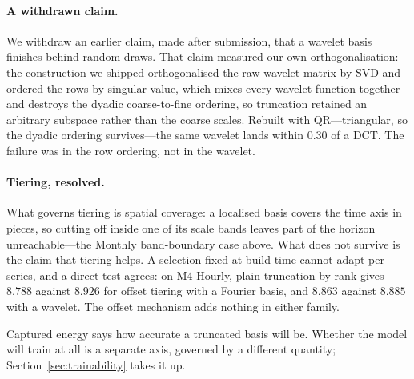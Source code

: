 \paragraph{A withdrawn claim.}
We withdraw an earlier claim, made after submission, that a wavelet basis
finishes behind random draws. That claim measured our own orthogonalisation: the
construction we shipped orthogonalised the raw wavelet matrix by SVD and ordered
the rows by singular value, which mixes every wavelet function together and
destroys the dyadic coarse-to-fine ordering, so truncation retained an arbitrary
subspace rather than the coarse scales. Rebuilt with QR---triangular, so the
dyadic ordering survives---the same wavelet lands within $0.30$ \smape{} of a
DCT. The failure was in the row ordering, not in the wavelet.

\paragraph{Tiering, resolved.}
What governs tiering is spatial coverage: a localised basis covers the time axis
in pieces, so cutting off inside one of its scale bands leaves part of the
horizon unreachable---the Monthly band-boundary case above. What does not
survive is the claim that tiering helps. A selection fixed at build time cannot
adapt per series, and a direct test agrees: on M4-Hourly, plain truncation by
rank gives $8.788$ against $8.926$ for offset tiering with a Fourier basis, and
$8.863$ against $8.885$ with a wavelet. The offset mechanism adds nothing in
either family.

Captured energy says how accurate a truncated basis will be. Whether the model
will train at all is a separate axis, governed by a different quantity;
Section~\ref{sec:trainability} takes it up.
